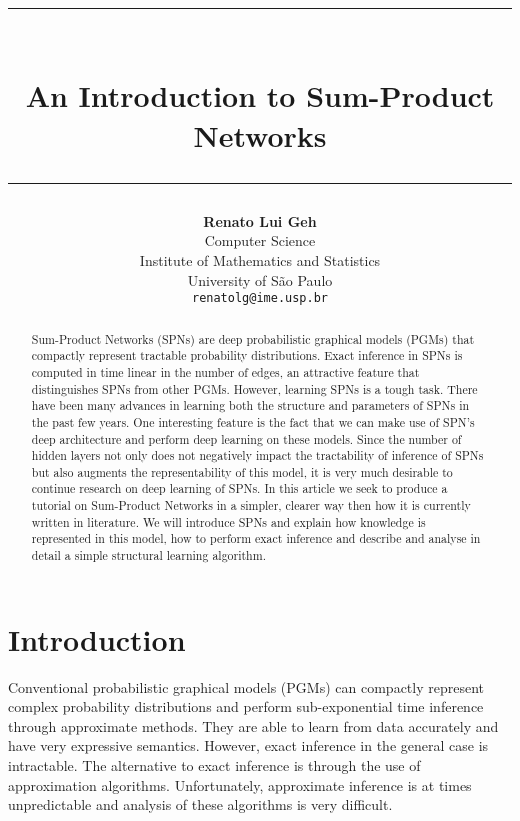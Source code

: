 \documentclass{amsart}
\title{%
  \noindent\rule{13cm}{1.0pt}\\
  \vspace{0.2cm}
  An Introduction to Sum-Product Networks
  \noindent\rule{13cm}{0.8pt}
}
\author[]{\normalsize\textbf{Renato Lui Geh}\\\small Computer Science\\Institute of Mathematics
  and Statistics\\University of São Paulo\\\texttt{renatolg@ime.usp.br}}
\theoremstyle{plain}
\numberwithin{equation}{section}
\begin{document}
\begin{abstract}
  Sum-Product Networks (SPNs) are deep probabilistic graphical models (PGMs) that compactly
  represent tractable probability distributions. Exact inference in SPNs is computed in time linear
  in the number of edges, an attractive feature that distinguishes SPNs from other PGMs. However,
  learning SPNs is a tough task. There have been many advances in learning both the structure and
  parameters of SPNs in the past few years. One interesting feature is the fact that we can make
  use of SPN's deep architecture and perform deep learning on these models. Since the number of
  hidden layers not only does not negatively impact the tractability of inference of SPNs but also
  augments the representability of this model, it is very much desirable to continue research on
  deep learning of SPNs. In this article we seek to produce a tutorial on Sum-Product Networks in
  a simpler, clearer way then how it is currently written in literature. We will introduce SPNs
  and explain how knowledge is represented in this model, how to perform exact inference and
  describe and analyse in detail a simple structural learning algorithm.
  \vspace*{-3.5em}
\end{abstract}

\maketitle

\section{Introduction}

Conventional probabilistic graphical models (PGMs) can compactly represent complex probability
distributions and perform sub-exponential time inference through approximate methods. They are able
to learn from data accurately and have very expressive semantics. However, exact inference in the
general case is intractable. The alternative to exact inference is through the use of approximation
algorithms. Unfortunately, approximate inference is at times unpredictable and analysis of these
algorithms is very difficult.
\end{document}

